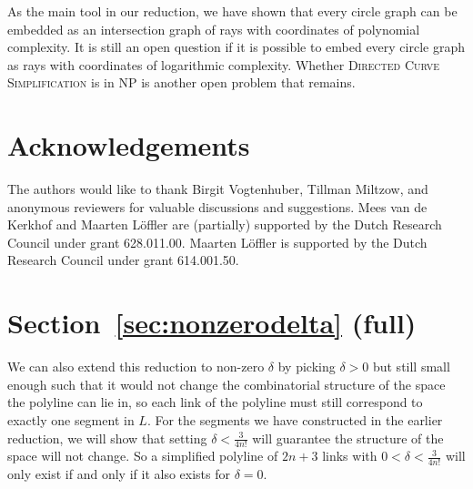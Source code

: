 \documentclass[]{llncs}
\newcommand{\curvesimp}{\textsc{Directed Curve Simplification}\xspace}
\newcommand{\rmk}[3]{\textcolor{blue}{\textsc{#1 #2:}}
\textcolor{red}{\textsf{#3}}}
\newcommand{\maarten}[2][says]{\rmk{Maarten}{#1}{#2}}
\begin{document}
As the main tool in our reduction, we have shown that every circle graph can be embedded as an intersection graph of rays with coordinates of polynomial complexity.
It is still an open question if it is possible to embed every circle graph as rays with coordinates of logarithmic complexity.
Whether \curvesimp is in NP is another open problem that remains.

\section* {Acknowledgements}
The authors would like to thank Birgit Vogtenhuber, Tillman Miltzow, and anonymous reviewers for valuable discussions and suggestions.
Mees van de Kerkhof and Maarten L\"offler are (partially) supported by the Dutch Research Council under grant  628.011.00. Maarten L\"offler is supported by the Dutch Research Council under grant 614.001.50.






\section {Section~\ref{sec:nonzerodelta} (full)}
\label{sec:nonzeroapp}
We can also extend this reduction to non-zero \(\delta\) by picking \(\delta > 0\) but still small enough such that it would not change the combinatorial structure of the space the polyline can lie in, so each link of the polyline must still correspond to exactly one segment in $L$.
%
For the segments we have constructed in the earlier reduction, we will show that setting \(\delta < \frac{3}{4n!}\) will guarantee the structure of the space will not change. So a simplified polyline of $2n+3$ links with \(0 < \delta < \frac{3}{4n!}\) will only exist if and only if it also exists for \(\delta = 0\).
\end{document}
